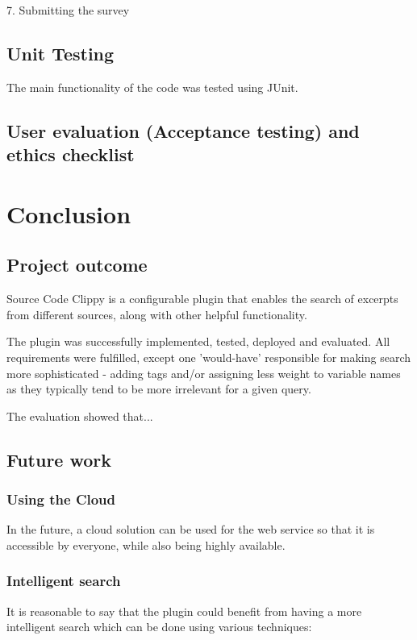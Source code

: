\documentclass{l4proj}
\begin{document}
7. Submitting the survey

\section{Unit Testing}
The main functionality of the code was tested using JUnit.

\section{User evaluation (Acceptance testing) and ethics checklist}

\chapter{Conclusion}

\section{Project outcome}

Source Code Clippy is a configurable plugin that enables the search of excerpts from different sources, along with other helpful functionality.

The plugin was successfully implemented, tested, deployed and evaluated. All requirements were fulfilled, except one 'would-have' responsible for making search more sophisticated - adding tags and/or assigning less weight to variable names as they typically tend to be more irrelevant for a given query.

The evaluation showed that...

\section{Future work}

\subsection{Using the Cloud}
In the future, a cloud solution can be used for the web service so that it is accessible by everyone, while also being highly available. 

\subsection{Intelligent search}
It is reasonable to say that the plugin could benefit from having a more intelligent search which can be done using various techniques:
\end{document}
